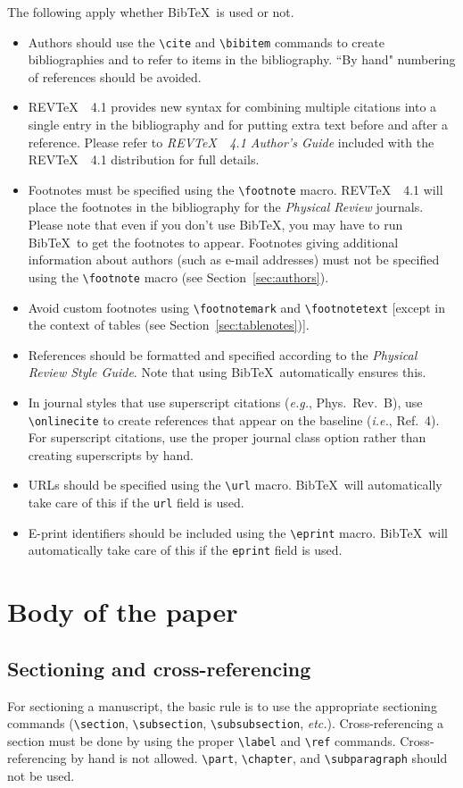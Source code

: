 \documentclass[twocolumn,secnumarabic,amssymb, nobibnotes, aps, prd]{revtex4-1}
\newcommand{\revtex}{REV\TeX\ }
\newcommand{\macro}[1]{\texttt{\textbackslash#1}}
\newcommand{\m}[1]{\macro{#1}}
\begin{document}
The following apply whether
Bib\TeX\ is used or not.  
\begin{itemize}
\item Authors should use the \m{cite} and \m{bibitem} commands to create
bibliographies and to refer to items in the bibliography. ``By hand"
numbering of references should be avoided.
\item \revtex~4.1 provides new syntax for combining multiple citations into a single entry in the bibliography and for putting extra text before and after a reference. Please refer to \textit{\revtex~4.1 Author's Guide} included with the \revtex~4.1 distribution for full details.
\item Footnotes must be specified using the \m{footnote}
macro. \revtex\ 4.1 will place the footnotes in
the bibliography for the \textit{Physical Review}
journals. Please note that even if you don't use Bib\TeX, you may have to run Bib\TeX\ to get the footnotes to appear. Footnotes giving additional information about authors (such
as e-mail addresses) must not be specified using the \m{footnote}
macro (see Section~\ref{sec:authors}).
\item Avoid custom footnotes using \m{footnotemark} and \m{footnotetext} [except in the context of tables (see
Section~\ref{sec:tablenotes})].
\item References should be formatted and specified according to the
\textit{Physical Review Style Guide}. Note that using Bib\TeX\ automatically ensures this.
\item In journal styles that use superscript citations (\textit{e.g.}, Phys.~Rev.~B), use \m{onlinecite} to create references that appear on the baseline (\textit{i.e.}, Ref.~4). For superscript citations, use the proper journal class option  rather than creating superscripts by hand.
\item URLs should be specified using the \m{url} macro. Bib\TeX\ will automatically take
care of this if the \texttt{url} field is used.
\item E-print identifiers should be included using the \m{eprint} macro. Bib\TeX\ will automatically take care of this if the \texttt{eprint} field is used.
\end{itemize}

\section{Body of the paper}
\subsection{Sectioning and cross-referencing}
For sectioning a manuscript, the basic rule is to use the appropriate
sectioning commands (\m{section}, \m{subsection}, \m{subsubsection},
\textit{etc.}). Cross-referencing a section must be done by using the
proper \m{label} and \m{ref} commands. Cross-referencing by hand is
not allowed. \m{part}, \m{chapter}, and \m{subparagraph} should not be
used.
\end{document}
